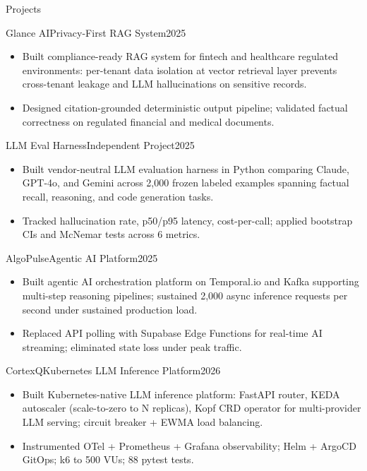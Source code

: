 \documentclass[]{mcdowellcv}
\begin{document}
\begin{cvsection}{Projects}
  \begin{cvsubsection}{Glance AI}{Privacy-First RAG System}{2025}
    \begin{itemize}
      \item Built compliance-ready RAG system for fintech and healthcare regulated environments: per-tenant data isolation at vector retrieval layer prevents cross-tenant leakage and LLM hallucinations on sensitive records.
      \item Designed citation-grounded deterministic output pipeline; validated factual correctness on regulated financial and medical documents.
    \end{itemize}
    \vspace{-1.5pt}
  \end{cvsubsection}

  \begin{cvsubsection}{LLM Eval Harness}{Independent Project}{2025}
    \begin{itemize}
      \item Built vendor-neutral LLM evaluation harness in Python comparing Claude, GPT-4o, and Gemini across 2,000 frozen labeled examples spanning factual recall, reasoning, and code generation tasks.
      \item Tracked hallucination rate, p50/p95 latency, cost-per-call; applied bootstrap CIs and McNemar tests across 6 metrics.
    \end{itemize}
    \vspace{-1.5pt}
  \end{cvsubsection}

  \begin{cvsubsection}{AlgoPulse}{Agentic AI Platform}{2025}
    \begin{itemize}
      \item Built agentic AI orchestration platform on Temporal.io and Kafka supporting multi-step reasoning pipelines; sustained 2,000 async inference requests per second under sustained production load.
      \item Replaced API polling with Supabase Edge Functions for real-time AI streaming; eliminated state loss under peak traffic.
    \end{itemize}
    \vspace{-1.5pt}
  \end{cvsubsection}

  \begin{cvsubsection}{CortexQ}{Kubernetes LLM Inference Platform}{2026}
    \begin{itemize}
      \item Built Kubernetes-native LLM inference platform: FastAPI router, KEDA autoscaler (scale-to-zero to N replicas), Kopf CRD operator for multi-provider LLM serving; circuit breaker + EWMA load balancing.
      \item Instrumented OTel + Prometheus + Grafana observability; Helm + ArgoCD GitOps; k6 to 500 VUs; 88 pytest tests.
    \end{itemize}
  \end{cvsubsection}
\end{cvsection}
\end{document}
